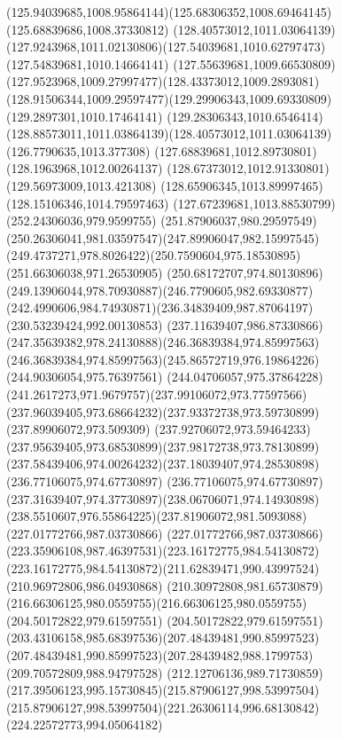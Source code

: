 {{		\curveto(125.94039685,1008.95864144)(125.68306352,1008.69464145)(125.68839686,1008.37330812)
		\moveto(128.40573012,1011.03064139)
		\curveto(127.9243968,1011.02130806)(127.54039681,1010.62797473)(127.54839681,1010.14664141)
		\curveto(127.55639681,1009.66530809)(127.9523968,1009.27997477)(128.43373012,1009.2893081)
		\curveto(128.91506344,1009.29597477)(129.29906343,1009.69330809)(129.2897301,1010.17464141)
		\curveto(129.28306343,1010.6546414)(128.88573011,1011.03864139)(128.40573012,1011.03064139)
		\moveto(126.7790635,1013.377308)
		\lineto(127.68839681,1012.89730801)
		\lineto(128.1963968,1012.00264137)
		\lineto(128.67373012,1012.91330801)
		\lineto(129.56973009,1013.421308)
		\lineto(128.65906345,1013.89997465)
		\lineto(128.15106346,1014.79597463)
		\lineto(127.67239681,1013.88530799)
		\closepath
		\moveto(252.24306036,979.9599755)
		\curveto(251.87906037,980.29597549)(250.26306041,981.03597547)(247.89906047,982.15997545)
		\curveto(249.4737271,978.8026422)(250.7590604,975.18530895)(251.66306038,971.26530905)
		\curveto(250.68172707,974.80130896)(249.13906044,978.70930887)(246.7790605,982.69330877)
		\curveto(242.4990606,984.74930871)(236.34839409,987.87064197)(230.53239424,992.00130853)
		\curveto(237.11639407,986.87330866)(247.35639382,978.24130888)(246.36839384,974.85997563)
		\curveto(246.36839384,974.85997563)(245.86572719,976.19864226)(244.90306054,975.76397561)
		\curveto(244.04706057,975.37864228)(241.2617273,971.9679757)(237.99106072,973.77597566)
		\curveto(237.96039405,973.68664232)(237.93372738,973.59730899)(237.89906072,973.509309)
		\curveto(237.92706072,973.59464233)(237.95639405,973.68530899)(237.98172738,973.78130899)
		\curveto(237.58439406,974.00264232)(237.18039407,974.28530898)(236.77106075,974.67730897)
		\curveto(236.77106075,974.67730897)(237.31639407,974.37730897)(238.06706071,974.14930898)
		\curveto(238.5510607,976.55864225)(237.81906072,981.5093088)(227.01772766,987.03730866)
		\curveto(227.01772766,987.03730866)(223.35906108,987.46397531)(223.16172775,984.54130872)
		\curveto(223.16172775,984.54130872)(211.62839471,990.43997524)(210.96972806,986.04930868)
		\curveto(210.30972808,981.65730879)(216.66306125,980.0559755)(216.66306125,980.0559755)
		\lineto(204.50172822,979.61597551)
		\curveto(204.50172822,979.61597551)(203.43106158,985.68397536)(207.48439481,990.85997523)
		\curveto(207.48439481,990.85997523)(207.28439482,988.1799753)(209.70572809,988.94797528)
		\curveto(212.12706136,989.71730859)(217.39506123,995.15730845)(215.87906127,998.53997504)
		\curveto(215.87906127,998.53997504)(221.26306114,996.68130842)(224.22572773,994.05064182)
}}
